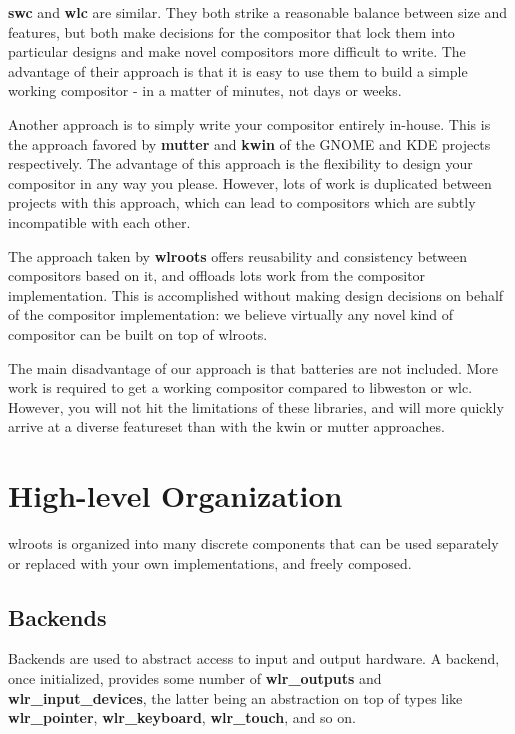 \documentclass{article}
\begin{document}
\textbf{swc} and \textbf{wlc} are similar. They both strike a reasonable balance
between size and features, but both make decisions for the compositor that lock
them into particular designs and make novel compositors more difficult to
write. The advantage of their approach is that it is easy to use them to build a
simple working compositor - in a matter of minutes, not days or weeks.

Another approach is to simply write your compositor entirely in-house. This is
the approach favored by \textbf{mutter} and \textbf{kwin} of the GNOME and KDE
projects respectively. The advantage of this approach is the flexibility to
design your compositor in any way you please. However, lots of work is
duplicated between projects with this approach, which can lead to compositors
which are subtly incompatible with each other.

The approach taken by \textbf{wlroots} offers reusability and consistency
between compositors based on it, and offloads lots work from the compositor
implementation. This is accomplished without making design decisions on behalf
of the compositor implementation: we believe virtually any novel kind of
compositor can be built on top of wlroots.

The main disadvantage of our approach is that batteries are not included. More
work is required to get a working compositor compared to libweston or wlc.
However, you will not hit the limitations of these libraries, and will more
quickly arrive at a diverse featureset than with the kwin or mutter approaches.

\section{High-level Organization}\label{highlevel}

wlroots is organized into many discrete components that can be used separately
or replaced with your own implementations, and freely composed.

\subsection{Backends}\label{high level backends}

Backends are used to abstract access to input and output hardware. A backend,
once initialized, provides some number of \textbf{wlr_outputs} and
\textbf{wlr_input_devices}, the latter being an abstraction on top of types
like \textbf{wlr_pointer}, \textbf{wlr_keyboard}, \textbf{wlr_touch}, and so on.
\end{document}
